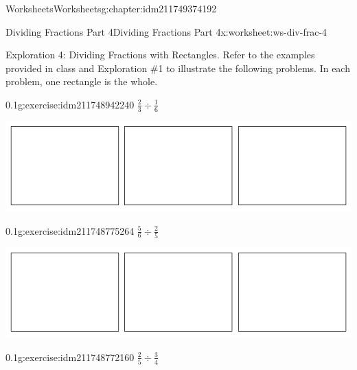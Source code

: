 \documentclass[twoside,11pt,]{book}
\begin{document}
\begin{chapterptx}{Worksheets}{}{Worksheets}{}{}{g:chapter:idm211749374192}
%
\begin{worksheet-section-numberless}{Dividing Fractions Part 4}{}{Dividing Fractions Part 4}{}{}{x:worksheet:ws-div-frac-4}
\begin{introduction}{}%
Exploration 4: Dividing Fractions with Rectangles.  Refer to the examples provided in class and Exploration \#1 to illustrate the following problems.  In each problem, one rectangle is the whole.%
\end{introduction}%
\begin{divisionexercise}{1}{}{0.1}{g:exercise:idm211748942240}%
\(\frac{2}{3} \div \frac{1}{6} \)%
\begin{sidebyside}{1}{0.1}{0.1}{0}%
\begin{sbspanel}{0.8}%
\includegraphics[width=1\linewidth]{images/3-rectangles.png}
\end{sbspanel}%
\end{sidebyside}%
\end{divisionexercise}%
\begin{divisionexercise}{2}{}{0.1}{g:exercise:idm211748775264}%
\(\frac{5}{6} \div \frac{2}{5} \)%
\begin{sidebyside}{1}{0.1}{0.1}{0}%
\begin{sbspanel}{0.8}%
\includegraphics[width=1\linewidth]{images/3-rectangles.png}
\end{sbspanel}%
\end{sidebyside}%
\end{divisionexercise}%
\begin{divisionexercise}{3}{}{0.1}{g:exercise:idm211748772160}%
\(\frac{2}{5} \div \frac{3}{4} \)%
\begin{sidebyside}{1}{0.1}{0.1}{0}%
\begin{sbspanel}{0.8}%

\end{sbspanel}
\end{sidebyside}
\end{divisionexercise}
\end{worksheet-section-numberless}
\end{chapterptx}
\end{document}

